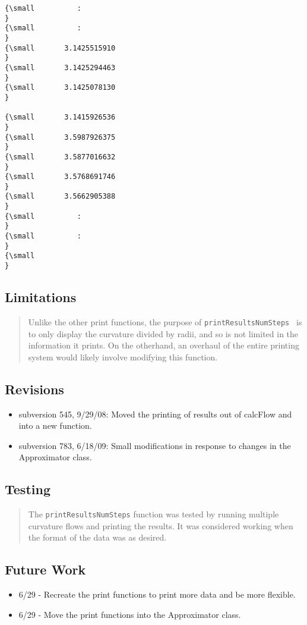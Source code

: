\begin{verbatim}
{\small          :
}
{\small          :
}
{\small       3.1425515910
}
{\small       3.1425294463
}
{\small       3.1425078130
}
 
{\small       3.1415926536
}
{\small       3.5987926375
}
{\small       3.5877016632
}
{\small       3.5768691746
}
{\small       3.5662905388
}
{\small          :
}
{\small          :
}
{\small   
}
\end{verbatim}

\subsection*{Limitations}

\begin{quotation}
Unlike the other print functions, the purpose of \texttt{printResultsNumSteps%
} is to only display the curvature divided by radii, and so is not limited
in the information it prints. On the otherhand, an overhaul of the entire
printing system would likely involve modifying this function.
\end{quotation}

\subsection*{Revisions}

\begin{itemize}
\item subversion 545, 9/29/08: Moved the printing of results out of calcFlow
and into a new function.

\item subversion 783, 6/18/09: Small modifications in response to changes in
the Approximator class.
\end{itemize}

\subsection*{Testing}

\begin{quotation}
The \texttt{printResultsNumSteps} function was tested by running multiple
curvature flows and printing the results. It was considered working when the
format of the data was as desired.
\end{quotation}

\subsection*{Future Work}

\begin{itemize}
\item 6/29 - Recreate the print functions to print more data and be more
flexible.

\item 6/29 - Move the print functions into the Approximator class.
\end{itemize}


%
